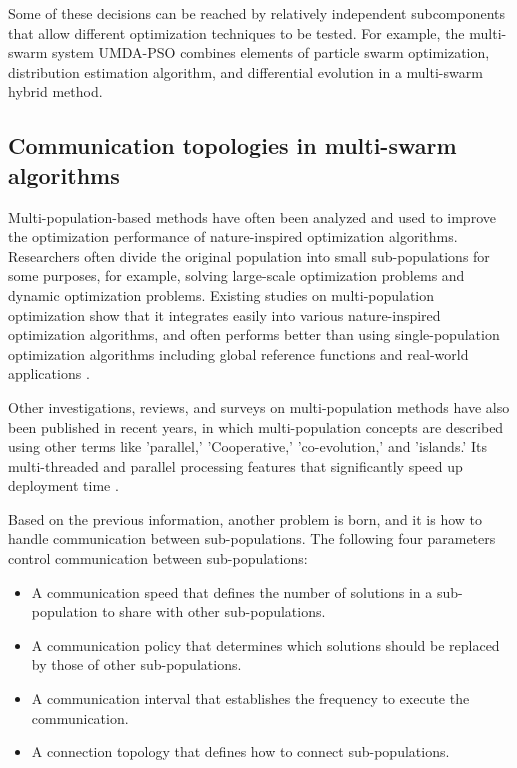 \documentclass[runningheads]{llncs}
\begin{document}
Some of these decisions can be reached by relatively independent subcomponents that allow different optimization techniques to be tested. For example, the multi-swarm system UMDA-PSO \cite{b10} combines elements of particle swarm optimization, distribution estimation algorithm, and differential evolution in a multi-swarm hybrid method.



\subsection{Communication topologies in multi-swarm algorithms}

Multi-population-based methods have often been analyzed and used to improve the optimization performance of nature-inspired optimization algorithms. Researchers often divide the original population into small sub-populations for some purposes, for example, solving large-scale optimization problems and dynamic optimization problems. Existing studies on multi-population optimization show that it integrates easily into various nature-inspired optimization algorithms, and often performs better than using single-population optimization algorithms including global reference functions and real-world applications \cite{b11}\cite{b12}.

Other investigations, reviews, and surveys on multi-population methods have also been published in recent years, in which multi-population concepts are described using other terms like  'parallel,' 'Cooperative,' 'co-evolution,' and 'islands.' Its multi-threaded and parallel processing features that significantly speed up deployment time \cite{b13}\cite{b14}.

Based on the previous information, another problem is born, and it is how to handle communication between sub-populations. The following four parameters control communication between sub-populations: 
\begin{itemize}
    \item A communication speed that defines the number of solutions in a sub-population to share with other sub-populations.
    \item A communication policy that determines which solutions should be replaced by those of other sub-populations.
    \item A communication interval that establishes the frequency to execute the communication.
    \item A connection topology that defines how to connect sub-populations.

\end{itemize}
\end{document}
